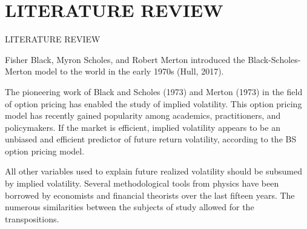 \documentclass[unknownkeysallowed, compress]{beamer}
\theoremstyle{plain}
\begin{document}
\section{LITERATURE REVIEW}
\begin{frame}{LITERATURE REVIEW}
    \noindent
\par Fisher Black, Myron Scholes, and Robert Merton introduced the Black-Scholes-Merton model to the world in the early 1970s (Hull, 2017).\\
\par The pioneering work of Black and Scholes (1973) and Merton (1973) in the field of option pricing has enabled the study of implied volatility. This option pricing model has recently gained popularity among academics, practitioners, and policymakers.
If the market is efficient, implied volatility appears to be an unbiased and efficient predictor of future return volatility, according to the BS option pricing model.\\

\par All other variables used to explain future realized volatility should be subsumed by implied volatility.
Several methodological tools from physics have been borrowed by economists and financial theorists over the last fifteen years. The numerous similarities between the subjects of study allowed for the transpositions.



\end{frame}
\end{document}
